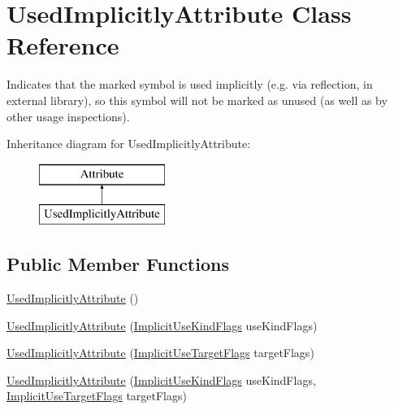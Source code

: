 \hypertarget{class_used_implicitly_attribute}{}\section{Used\+Implicitly\+Attribute Class Reference}
\label{class_used_implicitly_attribute}


Indicates that the marked symbol is used implicitly (e.\+g. via reflection, in external library), so this symbol will not be marked as unused (as well as by other usage inspections).  


Inheritance diagram for Used\+Implicitly\+Attribute\+:\begin{figure}[H]
\begin{center}
\leavevmode
\includegraphics[height=2.000000cm]{class_used_implicitly_attribute}
\end{center}
\end{figure}
\subsection*{Public Member Functions}
\begin{DoxyCompactItemize}
\item 
\hyperlink{class_used_implicitly_attribute_a58cbf99ae8d931a919ad26a1299dad17}{Used\+Implicitly\+Attribute} ()
\item 
\hyperlink{class_used_implicitly_attribute_ae2dc37889a97f27f89c986e0e46ad81f}{Used\+Implicitly\+Attribute} (\hyperlink{_annotations_8cs_acc26806cec0b003502b38c6c2ee67fd1}{Implicit\+Use\+Kind\+Flags} use\+Kind\+Flags)
\item 
\hyperlink{class_used_implicitly_attribute_ae1b2c052663335aa4bf2e3ff2510e821}{Used\+Implicitly\+Attribute} (\hyperlink{_annotations_8cs_a59f21202ead30f3d1e2093e42214bf7c}{Implicit\+Use\+Target\+Flags} target\+Flags)
\item 
\hyperlink{class_used_implicitly_attribute_ad9247e3d6829ade0057de0bb0c7e3cbf}{Used\+Implicitly\+Attribute} (\hyperlink{_annotations_8cs_acc26806cec0b003502b38c6c2ee67fd1}{Implicit\+Use\+Kind\+Flags} use\+Kind\+Flags, \hyperlink{_annotations_8cs_a59f21202ead30f3d1e2093e42214bf7c}{Implicit\+Use\+Target\+Flags} target\+Flags)
\end{DoxyCompactItemize}
